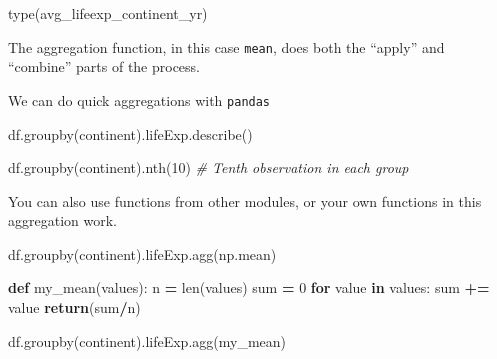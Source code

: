 \documentclass[
  letterpaper,
]{scrbook}
\newenvironment{Shaded}{\begin{snugshade}}{\end{snugshade}}
\newcommand{\BuiltInTok}[1]{#1}
\newcommand{\CommentTok}[1]{\textcolor[rgb]{0.56,0.35,0.01}{\textit{#1}}}
\newcommand{\ControlFlowTok}[1]{\textcolor[rgb]{0.13,0.29,0.53}{\textbf{#1}}}
\newcommand{\DecValTok}[1]{\textcolor[rgb]{0.00,0.00,0.81}{#1}}
\newcommand{\KeywordTok}[1]{\textcolor[rgb]{0.13,0.29,0.53}{\textbf{#1}}}
\newcommand{\NormalTok}[1]{#1}
\newcommand{\OperatorTok}[1]{\textcolor[rgb]{0.81,0.36,0.00}{\textbf{#1}}}
\newcommand{\StringTok}[1]{\textcolor[rgb]{0.31,0.60,0.02}{#1}}
\begin{document}
\begin{Shaded}
\begin{Highlighting}[]
\BuiltInTok{type}\NormalTok{(avg\_lifeexp\_continent\_yr)}
\end{Highlighting}
\end{Shaded}

The aggregation function, in this case \texttt{mean}, does both the ``apply'' and ``combine'' parts of the process.

We can do quick aggregations with \texttt{pandas}

\begin{Shaded}
\begin{Highlighting}[]
\NormalTok{df.groupby(}\StringTok{\textquotesingle{}continent\textquotesingle{}}\NormalTok{).lifeExp.describe()}
\end{Highlighting}
\end{Shaded}

\begin{Shaded}
\begin{Highlighting}[]
\NormalTok{df.groupby(}\StringTok{\textquotesingle{}continent\textquotesingle{}}\NormalTok{).nth(}\DecValTok{10}\NormalTok{) }\CommentTok{\# Tenth observation in each group}
\end{Highlighting}
\end{Shaded}

You can also use functions from other modules, or your own functions in this aggregation work.

\begin{Shaded}
\begin{Highlighting}[]
\NormalTok{df.groupby(}\StringTok{\textquotesingle{}continent\textquotesingle{}}\NormalTok{).lifeExp.agg(np.mean)}
\end{Highlighting}
\end{Shaded}

\begin{Shaded}
\begin{Highlighting}[]
\KeywordTok{def}\NormalTok{ my\_mean(values):}
\NormalTok{    n }\OperatorTok{=} \BuiltInTok{len}\NormalTok{(values)}
    \BuiltInTok{sum} \OperatorTok{=} \DecValTok{0}
    \ControlFlowTok{for}\NormalTok{ value }\KeywordTok{in}\NormalTok{ values:}
        \BuiltInTok{sum} \OperatorTok{+=}\NormalTok{ value}
    \ControlFlowTok{return}\NormalTok{(}\BuiltInTok{sum}\OperatorTok{/}\NormalTok{n)}

\NormalTok{df.groupby(}\StringTok{\textquotesingle{}continent\textquotesingle{}}\NormalTok{).lifeExp.agg(my\_mean)}
\end{Highlighting}
\end{Shaded}
\end{document}
